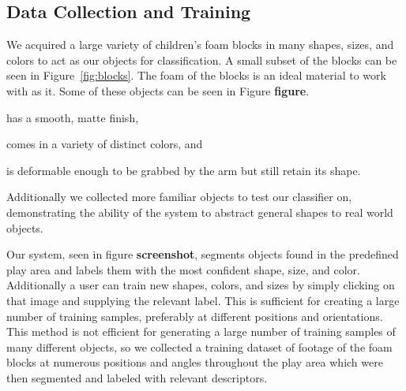 \documentclass[11pt]{article}
\newcommand{\meh}[1]{{\bf \color{blue} #1}}
\begin{document}
\subsection{Data Collection and Training}
We acquired a large variety of children's foam blocks in many shapes, sizes,
and colors to act as our objects for classification. A small subset of the
blocks can be seen in Figure~\ref{fig:blocks}. The foam of the blocks is an
ideal material to work with as it. Some of these
objects can be seen in Figure \meh{figure}.
\begin{inparaenum}[(1)]
\item has a smooth, matte finish,
\item comes in a variety of distinct colors, and
\item is deformable enough to be grabbed by the arm but still retain its
shape.
\end{inparaenum}
Additionally we collected
more familiar objects to test our classifier on, demonstrating the ability of
the system to abstract general shapes to real world objects. 


Our system, seen in figure \meh{screenshot}, segments objects found in the
predefined play area and labels them with the most confident shape, size, and
color.  Additionally a user can train new shapes, colors, and sizes by simply
clicking on that image and supplying the relevant label.  This is sufficient
for creating a large number of training samples, preferably at different
positions and orientations.  This method is not efficient for generating a
large number of training samples of many different objects, so we collected a
training dataset of footage of the foam blocks at numerous positions and angles
throughout the play area which were then segmented and labeled with relevant
descriptors.
\end{document}
